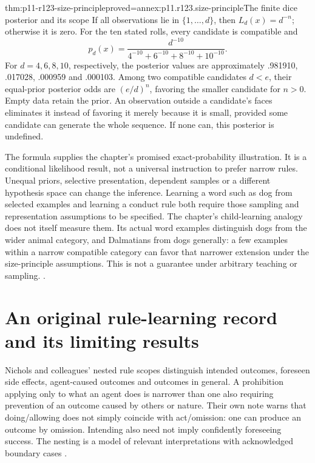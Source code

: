 \begin{hbtheorem}{thm:p11-r123-size-principle}{proved=annex:p11.r123.size-principle}{The finite dice posterior and its scope}
If all observations lie in \(\{1,\ldots,d\}\), then
\(L_d(x)=d^{-n}\); otherwise it is zero. For the ten stated rolls,
every candidate is compatible and
\[
       p_d(x)=\frac{d^{-10}}{4^{-10}+6^{-10}+8^{-10}+10^{-10}}.
\]
For \(d=4,6,8,10\), respectively, the posterior values are approximately
.981910, .017028, .000959 and .000103. Among two compatible candidates
\(d<e\), their equal-prior posterior odds are \((e/d)^n\), favoring
the smaller candidate for \(n>0\). Empty data retain the prior. An
observation outside a candidate's faces eliminates it instead of favoring
it merely because it is small, provided some candidate can generate the
whole sequence. If none can, this posterior is undefined.
\end{hbtheorem}

The formula supplies the chapter's promised exact-probability illustration.
It is a conditional likelihood result, not a universal instruction to
prefer narrow rules. Unequal priors, selective presentation, dependent
samples or a different hypothesis space can change the inference.
Learning a word such as dog from selected examples and learning a conduct
rule both require those sampling and representation assumptions to be
specified. The chapter's child-learning analogy does not itself measure
them. Its actual word examples distinguish dogs from the wider animal
category, and Dalmatians from dogs generally: a few examples within a
narrow compatible category can favor that narrower extension under the
size-principle assumptions. This is not a guarantee under arbitrary
teaching or sampling.
\parencite[p.~706]{WiegmannSauer2021MoralJudgment}.

\section{An original rule-learning record and its limiting results}
\label{sec:p11-r123-nichols}

Nichols and colleagues' nested rule scopes distinguish intended outcomes,
foreseen side effects, agent-caused outcomes and outcomes in general.
A prohibition applying only to what an agent does is narrower than one
also requiring prevention of an outcome caused by others or nature.
Their own note warns that doing/allowing does not simply coincide with
act/omission: one can produce an outcome by omission. Intending also
need not imply confidently foreseeing success. The nesting is a model
of relevant interpretations with acknowledged boundary cases
\parencite[pp.~535--537]{NicholsEtAl2016RulesR123}.

